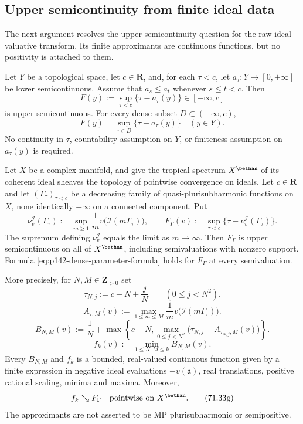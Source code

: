 \subsection{Upper semicontinuity from finite ideal data}

The next argument resolves the upper-semicontinuity question for the raw
ideal-valuative transform.  Its finite approximants are continuous functions,
but no positivity is attached to them.

\begin{lemma}\label{lem:p142-monotone-parameter-supremum}
Let $Y$ be a topological space, let $c\in\mathbf R$, and, for each
$\tau<c$, let $a_\tau:Y\to[0,+\infty]$ be lower semicontinuous.
Assume that $a_s\leq a_t$ whenever $s\leq t<c$. Then
\[
 F(y):=\sup_{\tau<c}\{\tau-a_\tau(y)\}
 \in[-\infty,c]
\]
is upper semicontinuous. For every dense subset $D\subset(-\infty,c)$,
\[
 F(y)=\sup_{\tau\in D}\{\tau-a_\tau(y)\}
 \quad(y\in Y).
 \tag{71.33a}
 \label{eq:p142-dense-parameter-formula}
\]
No continuity in $\tau$, countability assumption on $Y$, or finiteness
assumption on $a_\tau(y)$ is required.
\end{lemma}

\begin{theorem}\label{thm:p142-raw-transform-usc}
Let $X$ be a complex manifold, and give the tropical spectrum
$X^{\bethan}$ of its coherent ideal sheaves the topology of pointwise
convergence on ideals. Let $c\in\mathbf R$ and let
$(\Gamma_\tau)_{\tau<c}$ be a
decreasing family of quasi-plurisubharmonic functions on $X$, none
identically $-\infty$ on a connected component. Put
\[
 \nu_v^{\mathcal I}(\Gamma_\tau)
 :=\sup_{m\geq1}\frac1m v\bigl(\mathcal I(m\Gamma_\tau)\bigr),
 \qquad
 F_\Gamma(v):=\sup_{\tau<c}
       \{\tau-\nu_v^{\mathcal I}(\Gamma_\tau)\}.
 \tag{71.33b}
 \label{eq:p142-raw-transform}
\]
The supremum defining $\nu_v^{\mathcal I}$ equals the limit as
$m\to\infty$. Then $F_\Gamma$ is upper semicontinuous on all of
$X^{\bethan}$, including semivaluations with nonzero support. Formula
\eqref{eq:p142-dense-parameter-formula} holds for $F_\Gamma$ at every
semivaluation.

More precisely, for $N,M\in\mathbf Z_{>0}$ set
\[
 \tau_{N,j}:=c-N+\frac jN \qquad(0\leq j<N^2).
 \tag{71.33c}
 \label{eq:p142-mesh}
\]
\[
 A_{\tau,M}(v):=\max_{1\leq m\leq M}
       \frac1m v\bigl(\mathcal I(m\Gamma_\tau)\bigr).
 \tag{71.33d}
 \label{eq:p142-finite-ideal-values}
\]
\[
 B_{N,M}(v):=\frac1N+
   \max\left\{c-N,
       \max_{0\leq j<N^2}
        \bigl(\tau_{N,j}-A_{\tau_{N,j},M}(v)\bigr)\right\}.
 \tag{71.33e}
 \label{eq:p142-upper-approximants}
\]
\[
 f_k(v):=\min_{1\leq N,M\leq k}B_{N,M}(v).
 \tag{71.33f}
 \label{eq:p142-decreasing-sequence}
\]
Every $B_{N,M}$ and $f_k$ is a bounded, real-valued continuous function
given by a finite expression in negative ideal evaluations $-v(\mathfrak a)$,
real translations, positive rational scaling, minima and maxima. Moreover,
\[
 f_k\searrow F_\Gamma\quad\hbox{pointwise on }X^{\bethan}.
 \tag{71.33g}
 \label{eq:p142-exact-sequential-limit}
\]
The approximants are not asserted to be MP plurisubharmonic or
semipositive.
\end{theorem}

